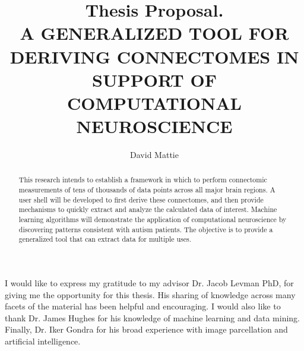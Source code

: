 \documentclass[12pt]{thesis}
\begin{document}
\title{Thesis Proposal.\\A GENERALIZED TOOL FOR DERIVING CONNECTOMES IN SUPPORT OF COMPUTATIONAL NEUROSCIENCE}

\author{David Mattie}



\msc










\dedication{to Dad}


\frontmatter

\begin{abstract}
This research intends to establish a framework in which to perform connectomic 
measurements of tens of thousands of data points across all major brain regions.  
A user shell will be developed to first derive these connectomes, and then provide 
mechanisms to quickly extract and analyze the calculated data of interest.  
Machine learning algorithms will demonstrate the application of computational 
neuroscience by discovering patterns consistent with autism patients.  
The objective is to provide a generalized tool that can extract data for 
multiple uses.
\end{abstract}


\begin{acknowledgements}
I would like to express my gratitude to my advisor Dr. Jacob Levman PhD, for giving 
me the opportunity for this thesis.  His sharing of knowledge across many facets of 
the material has been helpful and encouraging.  I would also like to thank 
Dr. James Hughes for his knowledge of machine learning and data mining.  Finally, 
Dr. Iker Gondra for his broad experience with image parcellation and artificial 
intelligence.
\end{acknowledgements}

\mainmatter


%
%
%
%
%

%
%

%

\end{document}
